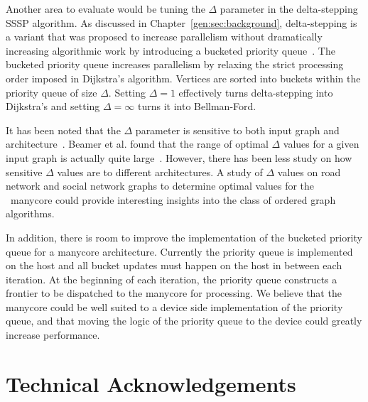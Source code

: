 Another area to evaluate would be tuning the $\Delta$ parameter in the delta-stepping SSSP algorithm.
As discussed in Chapter~\ref{gen:sec:background}, delta-stepping is a variant that was proposed to increase parallelism without dramatically increasing algorithmic work by introducing a bucketed priority queue~\cite{meyer2003delta}. 
The bucketed priority queue increases parallelism by relaxing the strict processing order imposed in Dijkstra's algorithm.
Vertices are sorted into buckets within the priority queue of size $\Delta$.
Setting $\Delta = 1$ effectively turns delta-stepping into Dijkstra's and setting $\Delta = \infty$ turns it into Bellman-Ford. 

It has been noted that the $\Delta$ parameter is sensitive to both input graph and architecture~\cite{beamer2016thesis}.
Beamer et al. found that the range of optimal $\Delta$ values for a given input graph is actually quite large~\cite{beamer2016thesis}. 
However, there has been less study on how sensitive $\Delta$ values are to different architectures. 
A study of $\Delta$ values on road network and social network graphs to determine optimal values for the \hb~manycore could provide interesting insights into the class of ordered graph algorithms.

In addition, there is room to improve the implementation of the bucketed priority queue for a manycore architecture.
Currently the priority queue is implemented on the host and all bucket updates must happen on the host in between each iteration.
At the beginning of each iteration, the priority queue constructs a frontier to be dispatched to the manycore for processing.
We believe that the manycore could be well suited to a device side implementation of the priority queue, and that moving the logic of the priority queue to the device could greatly increase performance.

\section{Technical Acknowledgements}

